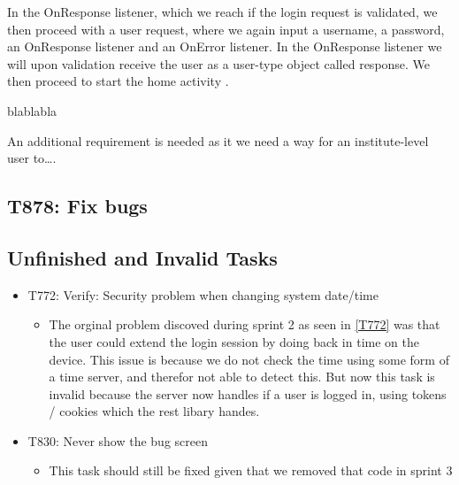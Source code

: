 In the OnResponse listener, which we reach if the login request is validated, we
then proceed with a user request, where we again input a username, a password,
an OnResponse listener and an OnError listener. In the OnResponse listener we
will upon validation receive the user as a user-type object called response. We
then proceed to start the home activity .

blablabla

An additional requirement is needed as it we need a way for an institute-level
user to\ldots. 






\subsection{T878: Fix bugs}

\subsection{Unfinished and Invalid Tasks}\label{S4Invalid}
\begin{itemize}
  \item T772: Verify: Security problem when changing system date/time
  	\begin{itemize}
  		\item The orginal problem discoved during sprint 2 as seen in \autoref{T772}
 		was that the user could extend the login session by doing back in time on the
  		device.
		This issue is because we do not check the time using some form of a time
		server, and therefor not able to detect this.  
		But now this task is invalid because the server now handles if a user is
		logged in, using tokens / cookies which the rest libary handes.
		\end{itemize}
  \item T830: Never show the bug screen
  	\begin{itemize}
  		\item This task should still be fixed given that we removed that code in
  		sprint 3
	\end{itemize}
\end{itemize}

